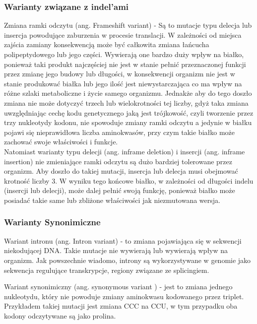\documentclass[12pt]{article}
\begin{document}
\subsubsection{Warianty związane z indel'ami}
\indent
\indent Zmiana ramki odczytu (ang. Frameshift variant) - Są to mutacje typu delecja lub insercja powodujące zaburzenia w procesie translacji. W zależności od miejsca zajścia zamiany konsekwencją może być całkowita zmiana łańcucha polipeptydowego lub jego części. Wywierają one bardzo duży wpływ na białko, ponieważ taki produkt najczęściej nie jest w stanie pełnić przeznaczonej funkcji przez zmianę jego budowy lub długości, w konsekwencji organizm nie jest w stanie produkować białka lub jego ilość jest niewystarczająca co ma wpływ na różne szlaki metaboliczne i życie samego organizmu. Jednakże aby do tego doszło zmiana nie może dotyczyć trzech lub wielokrotności tej liczby, gdyż taka zmiana uwzględniając cechę kodu genetycznego jaką jest trójkowość, czyli tworzenie przez trzy nukleotydy kodonu, nie spowoduje zmiany ramki odczytu a jedynie w białku pojawi się nieprawidłowa liczba aminokwasów, przy czym takie białko może zachować swoje właściwości i funkcje. \\

\indent Natomiast warianty typu delecji (ang. inframe deletion) i insercji (ang. inframe insertion) nie zmieniające ramki odczytu są dużo bardziej tolerowane przez organizm. Aby doszło do takiej mutacji, insercja lub delecja musi obejmować krotność liczby 3. W wyniku tego końcowe białko, w zależności od długości indelu (insercji lub delecji), może dalej pełnić swoją funkcję, ponieważ białko może posiadać takie same lub zbliżone właściwości jak niezmutowana wersja.

\subsubsection{Warianty Synonimiczne}
\indent
\indent Wariant intronu (ang. Intron variant) - to zmiana pojawiająca się w sekwencji niekodującej DNA. Takie mutacje nie wywierają lub wywierają wpływ na organizm. Jak powszechnie wiadomo, introny są wykorzystywane w genomie jako sekwencja regulujące transkrypcje, regiony związane ze splicingiem.
	
\indent Wariant synonimiczny (ang. synonymous variant ) - jest to zmiana jednego nukleotydu, który nie powoduje zmiany aminokwasu kodowanego przez triplet. Przykładem takiej mutacji jest zmiana CCC na CCU, w tym przypadku oba kodony odczytywane są jako prolina. 
\end{document}
